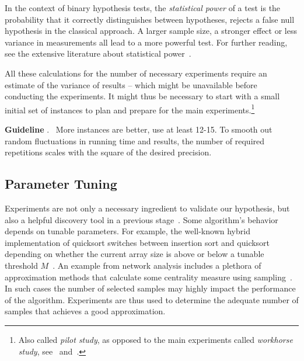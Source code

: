 \documentclass[algorithms,article,submit,moreauthors,pdftex]{Definitions/mdpi}
\newcounter{guideline}
\newcommand{\changed}[1]{#1}
\newcommand{\guideline}[1]{\par\smallskip\textbf{Guideline \theguideline\stepcounter{guideline}}.
\ #1\par\smallskip}
\begin{document}
In the context of binary hypothesis tests, the \emph{statistical power} of a test is the probability that it correctly distinguishes between hypotheses,
\ie rejects a false null hypothesis in the classical approach.
A larger sample size, a stronger effect or less variance in measurements all lead to a more powerful test.
For further reading, see the extensive literature about statistical power~\cite{ellis2010essential,Cohen88}.

All these calculations for the number of necessary experiments require an estimate of the variance of results -- which might be unavailable before conducting the experiments.
It might thus be necessary to start with a small initial set of instances to plan and prepare for the main experiments.\footnote{Also called \emph{pilot study}, as opposed to the main experiments called \emph{workhorse study}, see~\cite{McGeoch12} and~\cite{Rardin2001}.}
\changed{\guideline{More instances are better, use at least 12-15. To smooth out random fluctuations in running time and results, the number of required repetitions scales with the square of the desired precision.}}

\subsection{Parameter Tuning}
\label{sub:training-test-set}

Experiments are not only a necessary ingredient to validate our hypothesis, but also a
helpful discovery tool in a previous stage~\cite{Moret}.
Some algorithm's behavior depends on tunable parameters.
For example, the well-known hybrid implementation of \changed{q}uicksort switches between \changed{insertion sort}
and \changed{q}uicksort depending on whether the current array size is above or below a tunable threshold
$M$~\cite{sedgewick1978implementing}.
An example from network analysis includes a plethora of approximation methods
that calculate some centrality measure using
sampling~\cite{geisberger08,Eppstein:2001:FAC:365411.365449,riondato2016fast}.
In such cases the number of selected samples
may highly impact the performance of the algorithm.
Experiments are thus used to determine the adequate number of samples that achieves a good approximation.
\end{document}
